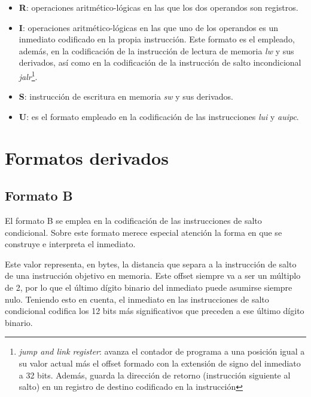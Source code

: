 \begin{itemize}
  \item \textbf{R}: operaciones aritmético-lógicas en las que los dos operandos son registros.
  \vspace{-0.2cm}
  \item \textbf{I}: operaciones aritmético-lógicas en las que uno de los operandos es un inmediato codificado en la propia instrucción. Este formato es el empleado, además, en la codificación de la instrucción de lectura de memoria \textit{lw} y sus derivados, así como en la codificación de la instrucción de salto incondicional \textit{jalr}\footnote{\textit{jump and link register}: avanza el contador de programa a una posición igual a su valor actual más el offset formado con la extensión de signo del inmediato a 32 bits. Además, guarda la dirección de retorno (instrucción siguiente al salto) en un registro de destino codificado en la instrucción}.
  \vspace{-0.2cm}
  \item \textbf{S}: instrucción de escritura en memoria \textit{sw} y sus derivados.
  \vspace{-0.2cm}
  \item \textbf{U}: es el formato empleado en la codificación de las instrucciones \textit{lui} y \textit{auipc}.
\end{itemize}

\section{Formatos derivados}

\subsection{Formato B}

El formato B se emplea en la codificación de las instrucciones de salto condicional. Sobre este formato merece especial atención la forma en que se construye e interpreta el inmediato.

Este valor representa, en bytes, la distancia que separa a la instrucción de salto de una instrucción objetivo en memoria. Este offset siempre va a ser un múltiplo de 2, por lo que el último dígito binario del inmediato puede asumirse siempre nulo. Teniendo esto en cuenta, el inmediato en las instrucciones de salto condicional codifica los 12 bits más significativos que preceden a ese último dígito binario.

